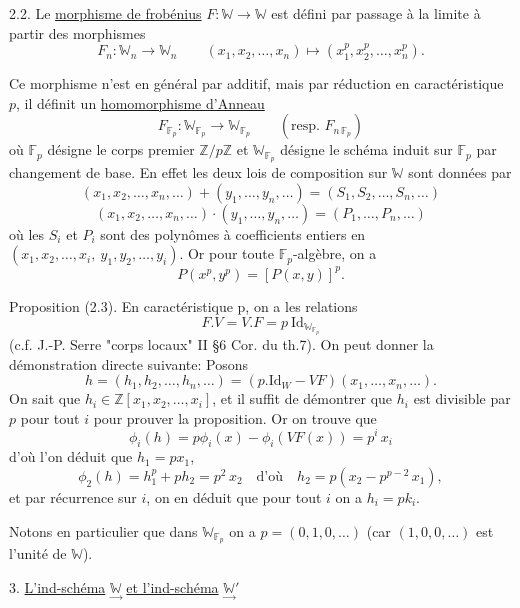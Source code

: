 \documentclass[11pt]{article}
\newcommand{\scanpage}[1]{\par\bigskip\noindent{\small\sffamily[scan #1]}\par}
\newcommand{\mspage}[1]{{\small\sffamily[p.\,#1]}}
\newcommand{\hand}[1]{\textcolor{blue}{#1}}
\newcommand{\uline}[1]{\underline{#1}}
\begin{document}
2.2. Le \uline{morphisme de frobénius} $F\colon \mathbb{W} \to \mathbb{W}$ est défini par passage
à la limite à partir des morphismes
\[ F_n\colon \mathbb{W}_n \to \mathbb{W}_n \qquad (x_1,x_2,\dots,x_n) \mapsto (x_1^p,x_2^p,\dots,x_n^p). \]

Ce morphisme n'est en général par additif, mais par réduction
en caractéristique $p$, il définit un \uline{homomorphisme d'Anneau}
\[ F_{\mathbb{F}_p} : \mathbb{W}_{\mathbb{F}_p} \to \mathbb{W}_{\mathbb{F}_p} \qquad (\text{resp. } F_{n\,\mathbb{F}_p}) \]
où $\mathbb{F}_p$ désigne le corps premier $\mathbb{Z}/p\mathbb{Z}$ et $\mathbb{W}_{\mathbb{F}_p}$ désigne le schéma
induit sur $\mathbb{F}_p$ par changement de base. En effet les deux lois de
composition sur $\mathbb{W}$ sont données par
\[ (x_1,x_2,\dots,x_n,\dots) + (y_1,\dots,y_n,\dots) = (S_1,S_2,\dots,S_n,\dots) \]
\[ (x_1,x_2,\dots,x_n,\dots)\cdot(y_1,\dots,y_n,\dots) = (P_1,\dots,P_n,\dots) \]
où les $S_i$ et $P_i$ sont des polynômes à coefficients entiers en
$(x_1,x_2,\dots,x_i,\ y_1,y_2,\dots,y_i)$. Or pour toute $\mathbb{F}_p$-algèbre, on a
\[ P(x^p,y^p) = [P(x,y)]^p. \]

\mspage{\hand{4}}

\clearpage
\scanpage{129/5}
Proposition (2.3). En caractéristique p, on a les relations
\[ F.V = V.F = p\ \mathrm{Id}_{\mathbb{W}_{\mathbb{F}_p}} \]
(c.f. J.-P. Serre "corps locaux" II §6 Cor. du th.7). On peut
donner la démonstration directe suivante: Posons
\[ h = (h_1,h_2,\ldots,h_n,\ldots) = (p.\mathrm{Id}_W - VF)(x_1,\ldots,x_n,\ldots). \]
On sait que $h_i \in \mathbb{Z}[x_1,x_2,\ldots,x_i]$, et il suffit de démontrer que $h_i$
est divisible par $p$ pour tout $i$ pour prouver la proposition. Or
on trouve que
\[ \phi_i(h) = p\phi_i(x) - \phi_i(VF(x)) = p^i\, x_i \]
d'où l'on déduit que $h_1 = px_1$,
\[ \phi_2(h) = h_1^p + ph_2 = p^2\, x_2 \quad \text{d'où} \quad h_2 = p(x_2-p^{p-2}\, x_1), \]
et par récurrence sur $i$, on en déduit que pour tout $i$ on a $h_i = pk_i$.

Notons en particulier que dans $\mathbb{W}_{\mathbb{F}_p}$ on a $p = (0,1,0,\ldots)$
(car $(1,0,0,\ldots)$ est l'unité de $\mathbb{W}$).

3. \uline{L'ind-schéma} $\underset{\rightarrow}{\mathbb{W}}$ \uline{et l'ind-schéma} $\underset{\rightarrow}{\mathbb{W}}'$
\end{document}
